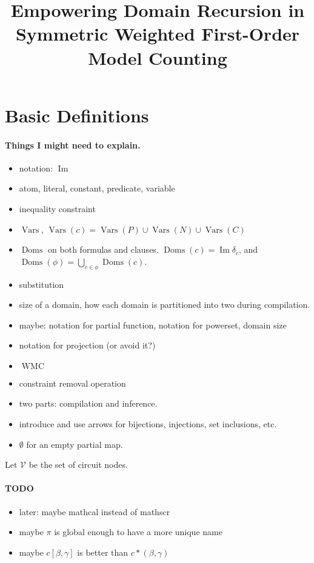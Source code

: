\documentclass{article}
\title{Empowering Domain Recursion in Symmetric Weighted First-Order Model Counting}
\theoremstyle{definition}
\DeclareMathOperator{\Imm}{Im}
\DeclareMathOperator{\Doms}{Doms}
\DeclareMathOperator{\Vars}{Vars}
\DeclareMathOperator{\WMC}{WMC}
\begin{document}
\maketitle

\section{Basic Definitions}

\paragraph{Things I might need to explain.}
\begin{itemize}
\item notation: $\Imm$
\item atom, literal, constant, predicate, variable
\item inequality constraint
\item $\Vars$, $\Vars(c) = \Vars(P) \cup \Vars(N) \cup \Vars(C)$
\item $\Doms$ on both formulas and clauses. $\Doms(c) = \Imm \delta_c$, and $\Doms(\phi) = \bigcup_{c \in \phi} \Doms(c)$.
\item substitution
\item size of a domain, how each domain is partitioned into two during compilation.
\item maybe: notation for partial function, notation for powerset, domain size
\item notation for projection (or avoid it?)
\item $\WMC$
\item constraint removal operation
\item two parts: compilation and inference.
\item introduce and use arrows for bijections, injections, set inclusions, etc.
\item $\emptyset$ for an empty partial map.
\end{itemize}

Let $\mathscr{V}$ be the set of circuit nodes.

\paragraph{TODO}
\begin{itemize}
\item later: maybe mathcal instead of mathscr
\item maybe $\pi$ is global enough to have a more unique name
\item maybe $c[\beta, \gamma]$ is better than $c \ast (\beta, \gamma)$
\end{itemize}
\end{document}
